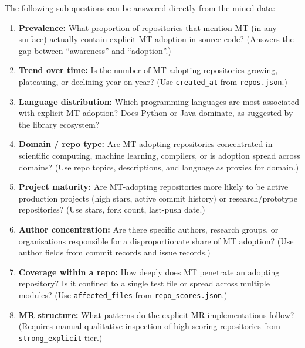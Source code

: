 \documentclass[12pt,a4paper]{article}
\begin{document}
The following sub-questions can be answered directly from the mined data:

\begin{enumerate}[label=\textbf{RQ2.\arabic*}]
  \item \textbf{Prevalence:} What proportion of repositories that mention MT
        (in any surface) actually contain explicit MT adoption in source code?
        (Answers the gap between ``awareness'' and ``adoption''.)

  \item \textbf{Trend over time:} Is the number of MT-adopting repositories
        growing, plateauing, or declining year-on-year? (Use
        \texttt{created\_at} from \texttt{repos.json}.)

  \item \textbf{Language distribution:} Which programming languages are most
        associated with explicit MT adoption? Does Python or Java dominate, as
        suggested by the library ecosystem?

  \item \textbf{Domain / repo type:} Are MT-adopting repositories concentrated
        in scientific computing, machine learning, compilers, or is adoption
        spread across domains? (Use repo topics, descriptions, and language as
        proxies for domain.)

  \item \textbf{Project maturity:} Are MT-adopting repositories more likely to
        be active production projects (high stars, active commit history) or
        research/prototype repositories? (Use stars, fork count, last-push date.)

  \item \textbf{Author concentration:} Are there specific authors, research
        groups, or organisations responsible for a disproportionate share of
        MT adoption? (Use author fields from commit records and issue records.)

  \item \textbf{Coverage within a repo:} How deeply does MT penetrate an
        adopting repository? Is it confined to a single test file or spread
        across multiple modules? (Use \texttt{affected\_files} from
        \texttt{repo\_scores.json}.)

  \item \textbf{MR structure:} What patterns do the explicit MR implementations
        follow? (Requires manual qualitative inspection of high-scoring
        repositories from \texttt{strong\_explicit} tier.)
\end{enumerate}
\end{document}
